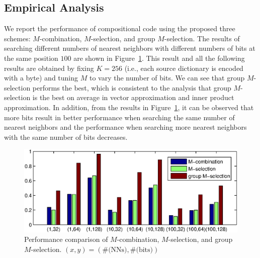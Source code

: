 \documentclass[10pt, letterpaper]{article}
\begin{document}
\subsection{Empirical Analysis}
We report the performance of compositional code
using the proposed three schemes:
$M$-combination,
$M$-selection,
and group $M$-selection.
The results of searching different numbers of nearest neighbors
with different numbers of bits
at the same position $100$
are shown in Figure~\ref{fig:comparisondifferentselectionschemes}.
This result and all the following results
are obtained by fixing $K=256$
(i.e., each source dictionary is encoded with a byte)
and tuning $M$ to vary the number of bits.
We can see that group $M$-selection
performs the best,
which is consistent to the analysis
that group $M$-selection is the best
on average in vector approximation
and inner product approximation.
In addition,
from the results in Figure~\ref{fig:comparisondifferentselectionschemes},
it can be observed that
more bits result in better performance
when searching the same number of nearest neighbors
and the performance when searching more nearest neighbors
with the same number of bits
decreases.

\begin{figure}[t]
\centering
\includegraphics[height=.26\textwidth, clip]{figs/CombinationSelectionComparison}
\vspace{-0.2cm}
\caption{Performance comparison
of $M$-combination, $M$-selection,
and group $M$-selection.
$(x, y) = (\text{\#(NNs)}, \text{\#(bits)})$}
\label{fig:comparisondifferentselectionschemes}\vspace{-0.5cm}
\end{figure}
\end{document}
